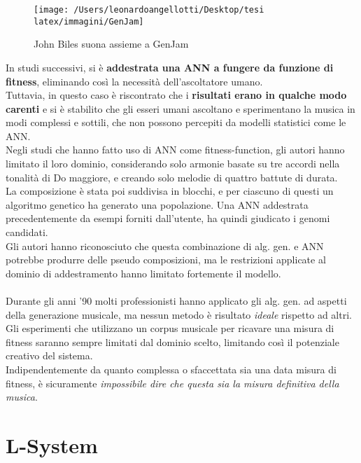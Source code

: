 \documentclass[a4paper,12pt]{report}
\begin{document}
\begin{figure}[H]
    \centering
    \texttt{[image: /Users/leonardoangellotti/Desktop/tesi latex/immagini/GenJam]} 
    \caption{John Biles suona assieme a GenJam}
    \label{fig:immagine7}
\end{figure}

In studi successivi, si è \textbf{addestrata una ANN a fungere da funzione di fitness}, eliminando così la necessità dell'ascoltatore umano. \\
Tuttavia, in questo caso è riscontrato che i \textbf{risultati erano in qualche modo carenti} e si è stabilito che gli esseri umani ascoltano e sperimentano la musica in modi complessi e sottili, che non possono percepiti da modelli statistici come le ANN. \\

Negli studi che hanno fatto uso di ANN come fitness-function, gli autori hanno limitato il loro dominio, considerando solo armonie basate su tre accordi nella tonalità di Do maggiore, e creando solo melodie di quattro battute di durata. \\
La composizione è stata poi suddivisa in blocchi, e per ciascuno di questi un algoritmo genetico ha generato una popolazione.
Una ANN addestrata precedentemente da esempi forniti dall'utente, ha quindi giudicato i genomi candidati. \\
Gli autori hanno riconosciuto che questa combinazione di alg. gen. e ANN potrebbe produrre delle pseudo composizioni, 
ma le restrizioni applicate al dominio di addestramento hanno limitato fortemente il modello. \\
\\
Durante gli anni ’90 molti professionisti hanno applicato gli alg. gen. ad aspetti della generazione musicale, ma nessun metodo è risultato \textit{ideale} rispetto ad altri. \\
Gli esperimenti che utilizzano un corpus musicale per ricavare una misura di fitness saranno sempre limitati dal dominio scelto, limitando così il potenziale creativo del sistema. \\
Indipendentemente da quanto complessa o sfaccettata sia una data misura di fitness, è sicuramente \textit{impossibile dire che questa sia la misura definitiva della musica}. 

\section{L-System}
\end{document}
